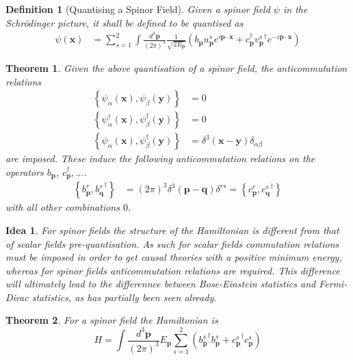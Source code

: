 \documentclass{article}
\newtheorem{theorem}{Theorem}[subsection]
\newtheorem{definition}{Definition}[subsection]
\newtheorem*{idea}{Idea}
\newcommand{\tmeas}{\frac{d^3\bm{p}}{(2\pi)^3}}
\newcommand{\acomm}[2][]{\left\{ #1, #2 \right\}} %
\begin{document}
\begin{definition}[Quantising a Spinor Field]
Given a spinor field $\psi$ in the Schr\"odinger picture, it shall be defined to be quantised as
\begin{align*}
\psi(\bm{x}) &= \sum_{s=1}^2 \int\tmeas  \frac{1}{\sqrt{2E_{\bm{p}}}} \left( b_{\bm{p}}u_{\bm{p}}^s e^{i\bm{p}\cdot\bm{x}} + c_{\bm{p}}^\dagger {v_{\bm{p}}^s}^\dagger e^{-i\bm{p}\cdot\bm{x}} \right) 
\end{align*}
\end{definition}

\begin{theorem}
Given the above quantisation of a spinor field, the anticommutation relations 
\begin{align*}
    \acomm[\psi_\alpha(\bm{x})]{\psi_\beta(\bm{y})} &= 0 \\
    \acomm[\psi_\alpha^\dagger(\bm{x})]{\psi_\beta^\dagger(\bm{y})} &= 0 \\
    \acomm[\psi_\alpha(\bm{x})]{\psi_\beta^\dagger(\bm{y})} &= \delta^3(\bm{x}-\bm{y})\delta_{\alpha\beta} 
\end{align*}
are imposed. These induce the following anticommutation relations on the operators $b_{\bm{p}}$, $c_{\bm{p}}^\dagger, \dots$. 
\begin{align*}
    \acomm[b_{\bm{p}}^r]{{b_{\bm{q}}^s}^\dagger} &= (2\pi)^3 \delta^3(\bm{p}-\bm{q}) \delta^{rs} = \acomm[c_{\bm{p}}^r]{{c_{\bm{q}}^s}^\dagger}
\end{align*}
with all other combinations $0$. 
\end{theorem}

\begin{idea}
For spinor fields the structure of the Hamiltonian is different from that of scalar fields pre-quantisation. As such for scalar fields commutation relations must be imposed in order to get causal theories with a positive minimum energy, whereas for spinor fields anticommutation relations are required. This difference will ultimately lead to the differennce between Bose-Einstein statistics and Fermi-Dirac statistics, as has partially been seen already. 
\end{idea}

\begin{theorem}
For a spinor field the Hamiltonian is 
\[
H=\int \tmeas E_{\bm{p}} \sum_{s=1}^2 ({b_{\bm{p}}^s}^\dagger b_{\bm{p}}^s + {c_{\bm{p}}^s}^\dagger c_{\bm{p}}^s )
\]
\end{theorem}

\end{document}
